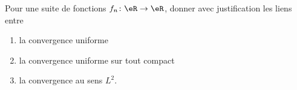 

\begin{exercice}\label{exo_I-4-3}

Pour une suite de fonctions $f_n\colon \eR\to \eR$, donner avec justification les liens entre
\begin{enumerate}
\item la convergence uniforme
\item la convergence uniforme sur tout compact
\item la convergence au sens $L^2$.
\end{enumerate}

\end{exercice}
